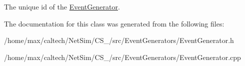 \-The unique id of the \hyperlink{classEventGenerator}{\-Event\-Generator}. 



\-The documentation for this class was generated from the following files\-:\begin{DoxyCompactItemize}
\item 
/home/max/caltech/\-Net\-Sim/\-C\-S\-\_/src/\-Event\-Generators/\-Event\-Generator.\-h\item 
/home/max/caltech/\-Net\-Sim/\-C\-S\-\_/src/\-Event\-Generators/\-Event\-Generator.\-cpp\end{DoxyCompactItemize}
